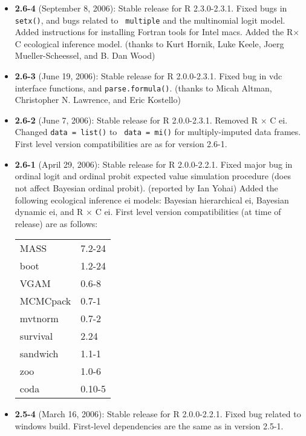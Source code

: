 \begin{itemize}
\item {\bf 2.6-4} (September 8, 2006): Stable release for R
2.3.0-2.3.1.  Fixed bugs in {\tt setx()}, and bugs related to {\tt
multiple} and the multinomial logit model.  Added instructions for
installing Fortran tools for Intel macs.  Added the R$\times$C
ecological inference model.  (thanks to Kurt Hornik, Luke Keele, Joerg
Mueller-Scheessel, and B. Dan Wood)

\item {\bf 2.6-3} (June 19, 2006): Stable release for R 2.0.0-2.3.1.  
Fixed bug in {\sc vdc} interface functions, and {\tt parse.formula()}.  
(thanks to Micah Altman, Christopher N. Lawrence, and Eric Kostello)

\item {\bf 2.6-2} (June 7, 2006): Stable release for R 2.0.0-2.3.1.
Removed R $\times$ C {\sc ei}.  Changed {\tt data = list()} to {\tt
data = mi()} for multiply-imputed data frames.  First level version
compatibilities are as for version 2.6-1.  

\item {\bf 2.6-1} (April 29, 2006): Stable release for R 2.0.0-2.2.1.
Fixed major bug in ordinal logit and ordinal probit expected value
simulation procedure (does not affect Bayesian ordinal probit).
(reported by Ian Yohai) Added the following ecological inference {\sc
ei} models: Bayesian hierarchical {\sc ei}, Bayesian dynamic {\sc ei},
and R $\times$ C {\sc ei}.  First level version compatibilities (at
time of release) are as follows:\newline
\begin{tabular}{ll}
MASS      &    7.2-24 \\
boot      &    1.2-24  \\        
VGAM      &    0.6-8   \\       
MCMCpack  &    0.7-1   \\       
mvtnorm   &    0.7-2   \\       
survival  &    2.24    \\       
sandwich  &    1.1-1   \\       
zoo       &    1.0-6   \\       
coda      &    0.10-5  \\
\end{tabular}

\item {\bf 2.5-4} (March 16, 2006): Stable release for R 2.0.0-2.2.1.  Fixed bug 
related to windows build.  First-level dependencies are the same as in version 
2.5-1.


\end{itemize}
